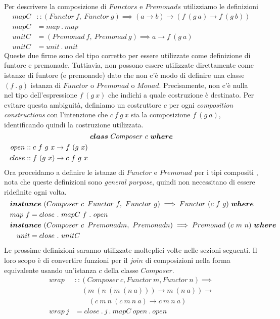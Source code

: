 Per descrivere la composizione di $Functors$ e $Premonads$ utilizziamo le
definizioni
\begin{align*}
  mapC &:: (Functor\ f,\ Functor\ g) \implies (a \to b) \to
  (f \ (g \ a) \to f\ (g\ b))\\
  mapC &= map\ .\ map\\
  unitC &= (Premonad\ f,\ Premonad\ g) \implies a \to f\ (g\ a)\\
  unitC &= unit\ .\ unit
\end{align*}
Queste due firme sono del tipo corretto per essere utilizzate come definizione
di funtore e premonade.
Tuttiavia, non possono essere utilizzate direttamente come istanze di funtore (e
premonade) dato che non c'è modo di definire una classe $(f\ .\ g)$ istanza
di $Functor$ o $Premonad$ o $Monad$.
Precisamente, non c'è nulla nel tipo dell'espressione $f\ (g\ x)$ che indichi
a quale costruzione è destinato.
Per evitare questa ambiguità, definiamo un costruttore $c$ per ogni
\textit{composition constructions} con l'intenzione che $c\ f\ g\ x$ sia la
composizione $f\ (g\ a)$, identificando quindi la costruzione utilizzata.
\begin{align*}
  \classdef{\bm{class}\ Composer\ c\ \bm{where}}
  open &:: c\ f\ g\ x \to f\ (g\ x)\\
  close &:: f\ (g\ x) \to c\ f\ g\ x
\end{align*}
Ora proceidamo a definire le istanze di $Functor$ e $Premonad$ per i tipi compositi
, nota che queste definizioni sono \textit{general purpose}, quindi non necessitano di essere
ridefinite ogni volta.
\begin{align*}
  \classdef{\bm{instance}\ (Composer\ c\,\ Functor\ f,\ Functor\ g) \implies Functor\ (c\ f\ g)\  \bm{where}}
  map\ f &= close\ .\ mapC\ f\ .\ open\\
  \classdef{\bm{instance}\ (Composer\ c\,\ Premonad m,\ Premonad n) \implies Premonad\ (c\ m\ n)\  \bm{where}}
  unit &= close\ .\ unitC
\end{align*}
Le prossime definizioni saranno utilizzate molteplici volte nelle sezioni
seguenti.
Il loro scopo è di convertire funzioni per il $join$ di composizioni nella forma
equivalente usando un'istanza $c$ della classe $Composer$.
\begin{align*}
  wrap &:: (Composer\ c, Functor\ m, Functor\ n) \implies\\
       &\quad (m\ (n\ (m\ (n\ a))) \to m\ (n\ a)) \to\\
       &\qquad (c\ m\ n\ (c\ m\ n\ a) \to c\ m\ n\ a)\\
  wrap\ j &= close\ .\ j\ .\ mapC\ open\ .\ open
\end{align*}
